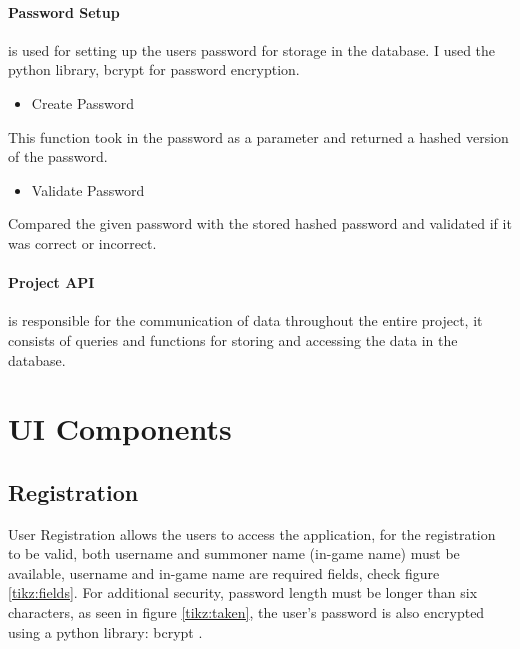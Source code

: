 \newpage
\paragraph{Password Setup} is used for setting up the users password for storage in the database. I used the python library, bcrypt for password encryption.

\begin{itemize}
	\item Create Password
\end{itemize}
This function took in the password as a parameter and returned a hashed version of the password.

\begin{itemize}
	\item Validate Password
\end{itemize}
Compared the given password with the stored hashed password and validated if it was correct or incorrect.


\paragraph{Project API} is responsible for the communication of data throughout the entire project, it consists of queries and functions for storing and accessing the data in the database.

\newpage
\section{UI Components}

\subsection{Registration}

User Registration allows the users to access the application, for the registration to be valid, both username and summoner name (in-game name) must be available, username and in-game name are required fields, check figure \ref{tikz:fields}. For additional security, password length must be longer than six characters, as seen in figure \ref{tikz:taken}, the user's password is also encrypted using a python library: bcrypt \cite{bcrypt}.

